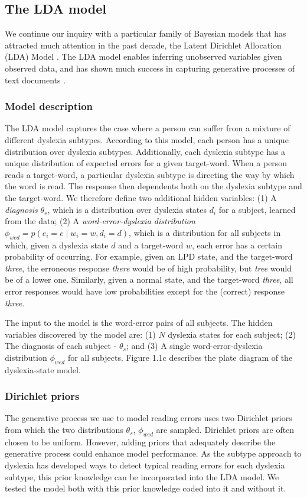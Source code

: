 {\subsection{The LDA model}
We continue our inquiry with a particular family of Bayesian models that has attracted much attention in the past decade, the Latent Dirichlet Allocation (LDA) Model \citep{bnj03}. The LDA model enables inferring unobserved variables given observed data, and has shown much success in capturing generative processes of text documents \citep{bnj03, rgss04}.

\subsubsection{Model description}
The LDA model captures the case where a person can suffer from a mixture of different dyslexia subtypes. According to this model, each person has a unique distribution over dyslexia subtypes. Additionally, each dys\-lexia subtype has a unique distribution of expected errors for a given target-word. When a person reads a target-word, a particular dyslexia subtype is directing the way by which the word is read. The response then dependents both on the dyslexia subtype and the target-word. We therefore define two additional hidden variables: (1) A {\it diagnosis} $ \theta_{s} $, which is a distribution over dyslexia states $ d_i $ for a subject, learned from the data; (2) A {\it word-error-dyslexia distribution} $ \phi_{wed} = p(e_i = e \mid w_i = w , d_i= d) $, which is a distribution for all subjects in which, given a dyslexia state $d$ and a target-word $w$, each error has a certain probability of occurring. For example, given an LPD state, and the target-word {\it three}, the erroneous response {\it there} would be of high probability, but {\it tree} would be of a lower one. Similarly, given a normal state, and the target-word {\it three}, all error responses would have low probabilities except for the (correct) response {\it three}. 

The input to the model is the word-error pairs of all subjects. The hidden variables discovered by the model are: (1) $N$ dyslexia states for each subject; (2) The diagnosis of each subject - $ \theta_{s} $; and (3) A single word-error-dyslexia distribution $ \phi_{wed} $ for all subjects. Figure 1.1c describes the plate diagram of the dyslexia-state model.

\subsubsection{Dirichlet priors}
The generative process we use to model reading errors uses two Dirichlet priors from which the two distributions $ \theta_{s}$, $\phi_{wed} $ are sampled. Dirichlet priors are often chosen to be uniform. However, adding priors that adequately describe the generative process could enhance model performance. As the subtype approach to dyslexia has developed ways to detect typical reading errors for each dyslexia subtype, this prior knowledge can be incorporated into the LDA model. We tested the model both with this prior knowledge coded into it and without it.

}
